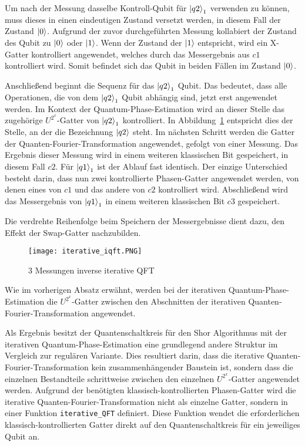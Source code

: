 Um nach der Messung dasselbe Kontroll-Qubit für \(\ket{q2}_1\) verwenden zu können, 
muss dieses in einen eindeutigen Zustand versetzt werden, 
in diesem Fall der Zustand \(\ket{0}\).
Aufgrund der zuvor durchgeführten Messung 
kollabiert der Zustand des Qubit zu \(\ket{0}\) oder \(\ket{1}\). 
Wenn der Zustand der \(\ket{1}\) entspricht, 
wird ein X-Gatter kontrolliert angewendet, 
welches durch das Messergebnis aus \(c1\) kontrolliert wird. 
Somit befindet sich das Qubit in beiden Fällen im Zustand \(\ket{0}\).

Anschließend beginnt die Sequenz für das \(\ket{q2}_1\) Qubit.
Das bedeutet, dass alle Operationen, die von dem \(\ket{q2}_1\) Qubit abhängig sind, 
jetzt erst angewendet werden.
Im Kontext der Quantum-Phase-Estimation wird an dieser Stelle das zugehörige \(U^{2^x}\)-Gatter von \(\ket{q2}_1\) kontrolliert.
In Abbildung~\ref{fig:iterative_iQFT} entspricht dies der Stelle, an der die Bezeichnung \(\ket{q2}\) steht.
Im nächsten Schritt werden die Gatter der Quanten-Fourier-Transformation angewendet, gefolgt von einer Messung. 
Das Ergebnis dieser Messung wird in einem weiteren klassischen Bit gespeichert, in diesem Fall \(c2\).
Für \(\ket{q1}_1\) ist der Ablauf fast identisch.
Der einzige Unterschied besteht darin, 
dass nun zwei kontrollierte Phasen-Gatter angewendet werden, 
von denen eines von \(c1\) und das andere von \(c2\) kontrolliert wird.
Abschließend wird das Messergebnis von \(\ket{q1}_1\) in einem weiteren klassischen Bit \(c3\) gespeichert.

Die verdrehte Reihenfolge beim Speichern der Messergebnisse dient dazu, 
den Effekt der Swap-Gatter nachzubilden.
\begin{figure}[H]
  \centering
  \texttt{[image: iterative\_iqft.PNG]}
  \caption{3 Messungen inverse iterative QFT}
  \label{fig:iterative_iQFT}
\end{figure}
  
Wie im vorherigen Absatz erwähnt, 
werden bei der iterativen Quantum-Phase-Estimation die \(U^{2^x}\)-Gatter zwischen den Abschnitten 
der iterativen Quanten-Fourier-Transformation angewendet. 

Als Ergebnis besitzt der Quantenschaltkreis für den Shor Algorithmus mit der iterativen Quantum-Phase-Estimation eine grundlegend andere Struktur 
im Vergleich zur regulären Variante.
Dies resultiert darin, dass die iterative Quanten-Fourier-Transformation kein zusammenhängender Baustein ist, 
sondern dass die einzelnen Bestandteile schrittweise zwischen 
den einzelnen \(U^{2^x}\)-Gatter angewendet werden.
Aufgrund der benötigten klassisch-kontrollierten Phasen-Gatter wird die iterative Quanten-Fourier-Transformation nicht als einzelne Gatter, 
sondern in einer Funktion \texttt{iterative\_QFT} definiert.
Diese Funktion wendet die erforderlichen klassisch-kontrollierten Gatter direkt auf den Quantenschaltkreis für ein jeweiliges Qubit an.

